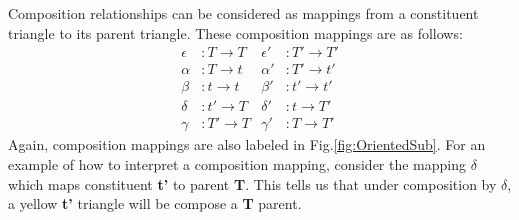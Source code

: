 \documentclass[
  oneside,
  11pt, a4paper,
  footinclude=true,
  headinclude=true,
  cleardoublepage=empty
]{scrbook}
\begin{document}
Composition relationships can be considered as mappings from a constituent triangle to its parent triangle. These composition mappings are as follows:
\begin{align}
\epsilon &: T \rightarrow T  &\epsilon' &: T' \rightarrow T' \nonumber\\  
\alpha &: T \rightarrow t  &\alpha' &: T' \rightarrow t' \nonumber\\  
\beta &: t \rightarrow t  &\beta' &: t' \rightarrow t' \label{eq:maps}\\  
\delta &: t' \rightarrow T  &\delta' &: t \rightarrow T' \nonumber\\ 
\gamma &: T' \rightarrow T  &\gamma' &: T \rightarrow T' \nonumber
\end{align}
Again, composition mappings are also labeled in Fig.\ref{fig:OrientedSub}. For an example of how to interpret a composition mapping, consider the mapping $\delta$ which maps constituent \textbf{t'} to parent \textbf{T}. This tells us that under composition by $\delta$, a yellow \textbf{t'} triangle will be compose a \textbf{T} parent.
\end{document}
